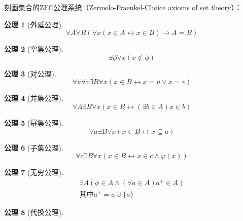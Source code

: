 \documentclass{book}[oneside]
\newtheorem{Ax}{公理}[chapter]
\begin{document}
\begin{CJK*}{UTF8}{gbsn}
刻画集合的ZFC公理系统（Zermelo-Fraenkel-Choice axioms of set theory）：
  \begin{Ax}[外延公理]
    \begin{equation*}
      \forall A \forall B (\forall x (x \in A \leftrightarrow x\in B)\rightarrow A = B)
    \end{equation*}
  \end{Ax}   
  \begin{Ax}[空集公理]
    \begin{equation*}
      \exists \phi \forall x (x \notin \phi)
    \end{equation*}
  \end{Ax}
  \begin{Ax}[对公理]
    \begin{equation*}
      \forall u \forall v \exists B \forall x (x \in B \leftrightarrow x = u \lor x = v)
    \end{equation*}
  \end{Ax}
  \begin{Ax}[并集公理]
    \begin{equation*}
     \forall A \exists B \forall x (x \in B \leftrightarrow (\exists b \in A) x \in b)
    \end{equation*}
  \end{Ax}
    \begin{Ax}[幂集公理]
    \begin{equation*}
      \forall a \exists B \forall x ( x \in B \leftrightarrow x \subseteq a)
    \end{equation*}
  \end{Ax}
  \begin{Ax}[子集公理]
    \begin{equation*}
      \forall c \exists B \forall x (x \in B \leftrightarrow x \in c \land \varphi(x))
    \end{equation*}
  \end{Ax}
  \begin{Ax}[无穷公理]
    \begin{equation*}
      \begin{split}
      \exists A ( \phi \in A \land (\forall a \in A) a^+ \in A)\\
      \text{其中} a^+ = a \cup \{a\}
      \end{split}
    \end{equation*}
  \end{Ax}
    \begin{Ax}[代换公理]
    \begin{equation*}
      \begin{split}

\end{split}
\end{equation*}
\end{Ax}
\end{CJK*}
\end{document}
